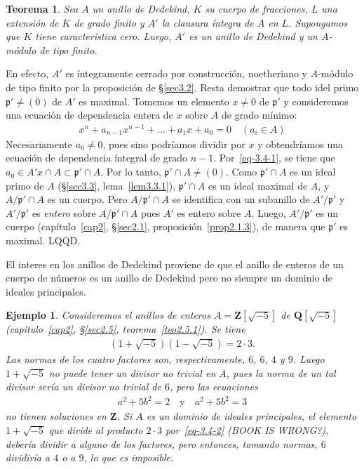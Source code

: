 \documentclass[bibtotoc,leqno,spanish]{amsbook}
\newcommand{\QQ}{\mathbf{Q}}
\newcommand{\ZZ}{\mathbf{Z}}
\newcommand{\idl}[1]{\mathfrak{#1}}
\newcommand{\QED}{LQQD.}
\numberwithin{equation}{section}
\theoremstyle{note}
\theoremstyle{note}
\newtheorem{theorem}{Teorema}
\theoremstyle{rem}
\newtheorem*{example*}{Ejemplo}
\numberwithin{theorem}{section}
\numberwithin{proposition}{section}
\numberwithin{definition}{section}
\numberwithin{lemma}{section}
\numberwithin{corollary}{section}
\numberwithin{example}{section}
\numberwithin{footnote}{section}%
\begin{document}
\begin{theorem}\label{teo3.4.1}
Sea $A$ un anillo de Dedekind, $K$ su cuerpo de fracciones, $L$ una extensi\'on de $K$ de grado finito y
$A'$ la clausura \'integra de $A$ en $L$. Supongamos que $K$ tiene caracter\'istica cero. Luego,
$A'$ es un anillo de Dedekind y un $A$-m\'odulo de tipo finito.
\end{theorem}

En efecto, $A'$ es \'integramente cerrado por construcci\'on, noetheriano y $A$-m\'odulo de tipo finito
por la proposici\'on de \S\ref{sec3.2}. Resta demostrar que todo idel primo $\idl{p}'\neq(0)$ de $A'$ es maximal. Tomemos
un elemento $x\neq 0$ de $\idl{p}'$ y consideremos una ecuaci\'on de dependencia entera de $x$ sobre $A$ de
grado m\'inimo:
\begin{gather}\label{eq-3.4-1}
x^{n}+a_{n-1}x^{n-1}+\dots+a_{1}x+a_{0} = 0\quad(a_{i}\in A)
\end{gather}
Necesariamente $a_{0}\neq 0$, pues sino podr\'iamos dividir por $x$ y obtendr\'iamos una ecuaci\'on de dependencia
\'integral de grado $n-1$. Por~\eqref{eq-3.4-1}, se tiene que $a_{0}\in A'x\cap A\subset\idl{p}'\cap A$. Por lo tanto,
$\idl{p}'\cap A\neq(0)$. Como $\idl{p}'\cap A$ es un ideal primo de $A$ (\S\ref{sec3.3}, lema~\ref{lem3.3.1}), $\idl{p}'\cap A$
es un ideal maximal de $A$, y $A/\idl{p'}\cap A$ es un cuerpo. Pero $A/\idl{p}'\cap A$ se identifica con un
subanillo de $A'/\idl{p}'$ y $A'/\idl{p'}$ es {\em entero} sobre $A/\idl{p}'\cap A$ pues $A'$ es entero
sobre $A$. Luego, $A'/\idl{p}'$ es un cuerpo (cap\'itulo~\ref{cap2}, \S\ref{sec2.1}, proposici\'on~\ref{prop2.1.3}), de manera que $\idl{p}'$
es maximal. \QED

El interes en los anillos de Dedekind proviene de que el anillo de enteros de un cuerpo de n\'umeros es un
anillo de Dedekind pero no siempre un dominio de ideales principales.

\begin{example*}
Consideremos el anillos de enteros $A = \ZZ[\sqrt{-5}]$ de $\QQ[\sqrt{-5}]$
(cap\'itulo~\ref{cap2}, \S\ref{sec2.5}, teorema~\ref{teo2.5.1}). Se tiene
\begin{gather}\label{eq-3.4-2}
(1+\sqrt{-5})(1-\sqrt{-5}) = 2\cdot 3.
\end{gather}
Las normas de los cuatro factores son, respectivamente, $6$, $6$, $4$ y $9$. Luego
$1+\sqrt{-5}$ no puede tener un divisor no trivial en $A$, pues la norma de un tal divisor
ser\'ia un divisor no trivial de $6$, pero las ecuaciones
\begin{gather*}
a^{2}+5b^{2}=2\quad\text{y}\quad a^{2}+5b^{2}=3
\end{gather*}
no tienen soluciones en $\ZZ$. Si $A$ es un dominio de ideales principales, el elemento $1+\sqrt{-5}$
que divide al producto $2\cdot 3$ por~\eqref{eq-3.4-2} (BOOK IS WRONG?), deber\'ia dividir a alguno de los factores, pero entonces,
tomando normas, $6$ dividir\'ia a $4$ o a $9$, lo que es imposible.
\end{example*}
\end{document}
